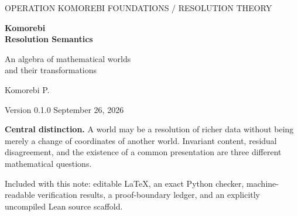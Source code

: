 \documentclass[11pt,letterpaper]{article}
\theoremstyle{definition}
\begin{document}
\thispagestyle{empty}
{\sffamily\small\color{muted} OPERATION KOMOREBI \hfill FOUNDATIONS / RESOLUTION THEORY}\par
\vspace{1.2cm}
{\sffamily\bfseries\color{ink}\fontsize{29}{34}\selectfont Komorebi\\Resolution Semantics\par}
\vspace{.35cm}
{\sffamily\Large An algebra of mathematical worlds\\and their transformations\par}
\vspace{.6cm}
{\large Komorebi P.}\par
{\sffamily\small Version 0.1.0 \quad September 26, 2026}
\vspace{.65cm}
\begin{abstract}
\noindent We develop the proposal that mathematical worlds can be studied as related resolutions rather than as an unstructured collection of competing universes. A small category of worlds, a functor of Boolean algebras, and a family of semantic valuations define a transport defect. This defect obeys an additive law, a twisted product rule, and an exact composition law. Its kernel is an invariant Boolean subalgebra, while its quotient is naturally an additive object.

A finite resolution theorem classifies every Boolean retraction onto the invariant sector and identifies canonical lower and upper envelopes when no canonical retraction exists. A two-world obstruction shows that even the smallest symmetric system need not admit a symmetry-preserving Boolean projector. Graph integrability gives an exact reconstruction criterion, and a separate real-valued realization recovers orthogonal multiresolution projectors. We also prove that any set-indexed family of first-order models admits a common Boolean-valued presentation, while explaining why this fact alone does not identify a shared generative structure.

The algebraic results are proved in the note and supported by reproducible exact checks. Forcing supplies a conditional set-theoretic interpretation, not a proof of new independence, consistency, or universe-existence claims. The framework is a precise research language and a collection of proved structural statements, not a completed extension of ZFC.
\end{abstract}
\vspace{.3cm}
\begin{scopebox}
\textbf{Central distinction.} A world may be a resolution of richer data without being merely a change of coordinates of another world. Invariant content, residual disagreement, and the existence of a common presentation are three different mathematical questions.
\end{scopebox}
\vfill
{\small\color{muted} Included with this note: editable \LaTeX, an exact Python checker, machine-readable verification results, a proof-boundary ledger, and an explicitly uncompiled Lean source scaffold.}
\newpage
\setcounter{tocdepth}{1}
\tableofcontents
\newpage
\end{document}
